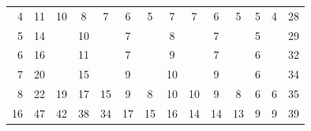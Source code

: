 \documentclass[smallcondensed,final]{svjour3}     %
\begin{document}
\begin{table}
\begin{tabular}{|r|c c|c c|c c||c c|c c|c c||c|}
4 & 11 & 10 & 8 & 7 & 6 & 5 & 7 & 7 & 6 & 5 & 5 & 4 & 28 \\

5 & 14 & & 10 & & 7 & & 8 & & 7 & & 5 & & 29  \\

6 & 16 & & 11 & & 7 & & 9 & & 7 & & 6 & & 32  \\

7 & 20 & & 15 & & 9 & & 10 & & 9 & & 6 & & 34 \\

8 & 22 & 19 & 17 & 15 & 9 & 8 & 10 & 10 & 9 & 8 & 6 & 6 & 35 \\

16 & 47 & 42 & 38 & 34 & 17 & 15 & 16 & 14 & 14 & 13 & 9 & 9 & 39 \\

\hline 

 \end{tabular}

\end{table}
\end{document}
